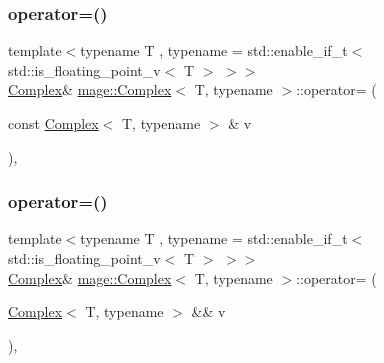 \subsubsection{\texorpdfstring{operator=()}{operator=()}\hspace{0.1cm}{\footnotesize\ttfamily [1/2]}}
{\footnotesize\ttfamily template$<$typename T , typename  = std\+::enable\+\_\+if\+\_\+t$<$ std\+::is\+\_\+floating\+\_\+point\+\_\+v$<$ T $>$ $>$$>$ \\
\mbox{\hyperlink{structmage_1_1_complex}{Complex}}\& \mbox{\hyperlink{structmage_1_1_complex}{mage\+::\+Complex}}$<$ T, typename $>$\+::operator= (\begin{DoxyParamCaption}\item[{const \mbox{\hyperlink{structmage_1_1_complex}{Complex}}$<$ T, typename $>$ \&}]{v }\end{DoxyParamCaption})\hspace{0.3cm}{\ttfamily [default]}, {\ttfamily [noexcept]}}

\mbox{\label{structmage_1_1_complex_a5b8c3f912bb20b5ea1749508410dcfd5}} 
\subsubsection{\texorpdfstring{operator=()}{operator=()}\hspace{0.1cm}{\footnotesize\ttfamily [2/2]}}
{\footnotesize\ttfamily template$<$typename T , typename  = std\+::enable\+\_\+if\+\_\+t$<$ std\+::is\+\_\+floating\+\_\+point\+\_\+v$<$ T $>$ $>$$>$ \\
\mbox{\hyperlink{structmage_1_1_complex}{Complex}}\& \mbox{\hyperlink{structmage_1_1_complex}{mage\+::\+Complex}}$<$ T, typename $>$\+::operator= (\begin{DoxyParamCaption}\item[{\mbox{\hyperlink{structmage_1_1_complex}{Complex}}$<$ T, typename $>$ \&\&}]{v }\end{DoxyParamCaption})\hspace{0.3cm}{\ttfamily [default]}, {\ttfamily [noexcept]}}

\mbox{\label{structmage_1_1_complex_ad936a066f69269d5dcd6bccf0f4d6597}} 
